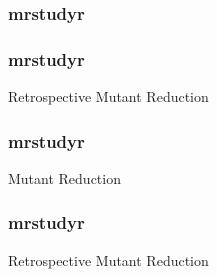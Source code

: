   \begin{frame}
    \frametitle{mrstudyr}
    \begin{figure}[!htb]
    \centering
    
    \end{figure}
  \end{frame}

  \begin{frame}
    \frametitle{mrstudyr}
    \centering
    {\HUGE Retrospective Mutant Reduction}
  \end{frame}

  \begin{frame}
    \frametitle{mrstudyr}
    \centering
    {\HUGE {\textcolor{solarizedViolet}{Retrospective}} Mutant Reduction}
  \end{frame}

  \begin{frame}
    \frametitle{mrstudyr}
    \centering
    {\HUGE Retrospective {\textcolor{solarizedViolet}{Mutant Reduction}}}
  \end{frame}
